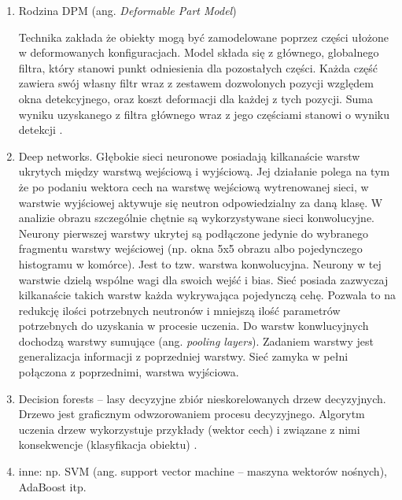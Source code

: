 \begin{enumerate}
\item Rodzina DPM (ang. \textit{Deformable Part Model}) 

Technika zakłada że obiekty mogą być zamodelowane poprzez części ułożone w deformowanych konfiguracjach. Model składa się z głównego, globalnego filtra, który stanowi punkt odniesienia dla pozostałych części. Każda część zawiera swój własny filtr wraz z zestawem dozwolonych pozycji względem okna detekcyjnego, oraz koszt deformacji dla każdej z tych pozycji. Suma wyniku uzyskanego z filtra głównego wraz z jego częściami stanowi o wyniku detekcji \cite{felzenszwalb2008discriminatively}.

\item Deep networks.
Głębokie sieci neuronowe posiadają kilkanaście warstw ukrytych między warstwą wejściową i wyjściową. Jej działanie polega na tym że po podaniu wektora cech na warstwę wejściową wytrenowanej sieci, w warstwie wyjściowej aktywuje się neutron odpowiedzialny za daną klasę. W analizie obrazu szczególnie chętnie są wykorzystywane sieci konwolucyjne. Neurony pierwszej warstwy ukrytej są podłączone jedynie do wybranego fragmentu warstwy wejściowej (np. okna 5x5 obrazu albo pojedynczego histogramu w komórce). Jest to tzw. warstwa konwolucyjna. Neurony w tej warstwie dzielą wspólne wagi dla swoich wejść i bias. Sieć posiada zazwyczaj kilkanaście takich warstw każda wykrywająca pojedynczą cehę. Pozwala to na redukcję ilości potrzebnych neutronów i mniejszą ilość parametrów potrzebnych do uzyskania w procesie uczenia. Do warstw konwlucyjnych dochodzą warstwy sumujące (ang. \textit{pooling layers}). Zadaniem warstwy jest generalizacja informacji z poprzedniej warstwy. Sieć zamyka w pełni połączona z poprzednimi, warstwa wyjściowa.

\item Decision forests –  lasy decyzyjne zbiór nieskorelowanych drzew decyzyjnych. Drzewo jest graficznym odwzorowaniem procesu decyzyjnego. Algorytm uczenia drzew wykorzystuje przykłady (wektor cech) i związane z nimi konsekwencje (klasyfikacja obiektu) \cite{wikiedia}. 

\item inne:  np. SVM (ang. support vector machine – maszyna wektorów nośnych), AdaBoost itp. 


\end{enumerate}





